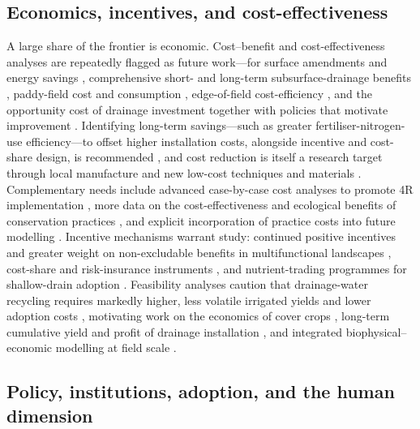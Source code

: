 \subsection{Economics, incentives, and cost-effectiveness}

A large share of the frontier is economic. Cost--benefit and cost-effectiveness
analyses are repeatedly flagged as future work---for surface amendments and
energy savings \parencite{Wamono2016b}, comprehensive short- and long-term
subsurface-drainage benefits \parencite{Guo2025}, paddy-field cost and
consumption \parencite{Jia2023}, edge-of-field cost-efficiency
\parencite{Mendes2020}, and the opportunity cost of drainage investment together
with policies that motivate improvement
\parencite{Wichelns2002,THOMAS1995,Kladivko2005,Saadat2017,Manik2019,Helmers2012}.
Identifying long-term savings---such as greater fertiliser-nitrogen-use
efficiency---to offset higher installation costs, alongside incentive and
cost-share design, is recommended \parencite{Castellano2019,Sunohara2015}, and
cost reduction is itself a research target through local manufacture and new
low-cost techniques and materials \parencite{Datta2002,Yannopoulos2020}.
Complementary needs include advanced case-by-case cost analyses to promote 4R
implementation \parencite{Liu2021}, more data on the cost-effectiveness and
ecological benefits of conservation practices \parencite{Yuan2022}, and explicit
incorporation of practice costs into future modelling \parencite{McLellan2015}.
Incentive mechanisms warrant study: continued positive incentives and greater
weight on non-excludable benefits in multifunctional landscapes
\parencite{Christianson2014}, cost-share and risk-insurance instruments
\parencite{Jaynes2012,Karlen2005}, and nutrient-trading programmes for
shallow-drain adoption \parencite{Ghane2021b}. Feasibility analyses caution that
drainage-water recycling requires markedly higher, less volatile irrigated
yields and lower adoption costs \parencite{Sellars2022}, motivating work on the
economics of cover crops \parencite{Waring2020}, long-term cumulative yield and
profit of drainage installation \parencite{Mourtzinis2021}, and integrated
biophysical--economic modelling at field scale \parencite{Ferin2023}.

\subsection{Policy, institutions, adoption, and the human dimension}

